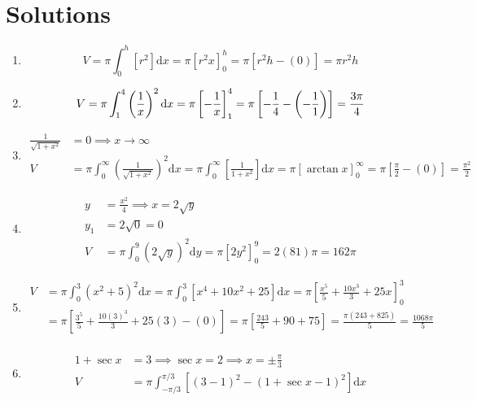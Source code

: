 \documentclass[12pt, A4]{report}
\renewcommand{\d}{\text{d}}
\begin{document}
		\section*{Solutions}
			\begin{enumerate}
				\item
					\[
						V = \pi\int_0^h\left[r^2\right]\d x
								= \pi\left[r^2x\right]_0^h
								= \pi\left[r^2h - (0)\right]
								= \pi r^2h
					\]
				\item
					\[
						V = \pi\int_1^4\left(\frac{1}{x}\right)^2\d x
								 = \pi\left[-\frac{1}{x}\right]_1^4
								 = \pi\left[-\frac{1}{4} -\left(-\frac{1}{1}\right)\right]
								 = \frac{3\pi}{4} \\
					\]
				\item
					\begin{align*}
						\frac{1}{\sqrt{1 + x^2}} &= 0 \implies x \to \infty\\
						V &= \pi\int_0^\infty\left(\frac{1}{\sqrt{1 + x^2}}\right)^2\d x
								= \pi\int_0^\infty\left[\frac{1}{1 + x^2}\right]\d x
								= \pi[\arctan x]_0^{\infty}
								= \pi\left[\frac{\pi}{2} - (0)\right]
								= \frac{\pi^2}{2}
					\end{align*}
				\item
					\begin{align*}
						y &= \frac{x^2}{4} \implies x = 2\sqrt{y} \\
						y_1 &= 2\sqrt{0} = 0 \\
						V &= \pi\int_0^9\left(2\sqrt{y}\right)^2\d y = \pi\left[2y^2\right]_0^9 = 2(81)\pi = 162\pi
					\end{align*}
				\item
					\begin{align*}
						V &= \pi\int_0^3\left(x^2 + 5\right)^2\d x 
								= \pi\int_{0}^3\left[x^4 + 10x^2 + 25\right]\d x 
								= \pi\left[\frac{x^5}{5} + \frac{10x^3}{3} + 25x\right]_0^3 \\
							&= \pi\left[\frac{3^5}{5} + \frac{10(3)^3}{3} + 25(3) - (0)\right] 
								= \pi\left[\frac{243}{5} + 90 + 75\right] 
								= \frac{\pi(243 + 825)}{5} 
								= \frac{1068\pi}{5} \\
					\end{align*}
				\item
					\begin{align*}
						1 + \sec x &= 3 \implies \sec x = 2 \implies x = \pm\frac{\pi}{3} \\
						V &= \pi\int_{-\pi/3}^{\pi/3}\left[(3 - 1)^2 - (1 + \sec x - 1)^2\right]\d x

\end{align*}
\end{enumerate}
\end{document}
